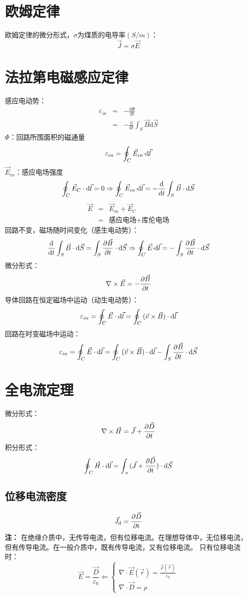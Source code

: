 \section{欧姆定律}
欧姆定律的微分形式，$\sigma$为煤质的电导率$(S/m)$：
$$\vec{J}=\sigma\vec{E}$$

\section{法拉第电磁感应定律}
感应电动势：
\begin{eqnarray*}
	\varepsilon_{in} &=& -\frac{\mathrm{d}\Phi}{\mathrm{d}t} \\
	&=& - \frac{\mathrm{d}}{\mathrm{d}t}\int_S \vec{B}\mathrm{d}\vec{S}
\end{eqnarray*}
$\Phi$：回路所围面积的磁通量
$${\varepsilon _{in}} = \oint_C {{{\vec E}_{in}}\cdot} {\rm{ d}}\vec l$$
$\vec{E}_{in}$：感应电场强度
$$\oint_C\vec{E}_C\cdot\mathrm{d}\vec{l}=0 \Rightarrow \oint_C {{{\vec E}_{in}}\cdot} {\rm{d}}\vec l =  - {{\rm{d}} \over {{\rm{d}}t}}\int_S {\vec B\cdot{\rm{d}}\vec S} $$
\begin{eqnarray*}
	\vec{E}&=&\vec{E}_{in}+\vec{E}_C \\
	&=&\text{感应电场}+\text{库伦电场}
\end{eqnarray*}
回路不变，磁场随时间变化（感生电动势）：
$${{\rm{d}} \over {{\rm{d}}t}}\int_S {\vec B \cdot {\rm{d}}\vec S}  = \int_S {{{\partial \vec B} \over {\partial t}} \cdot {\rm{d}}\vec S} \Rightarrow \oint_C {\vec E \cdot } {\rm{d}}\vec l =  - \int_S {{{\partial \vec B} \over {\partial t}} \cdot {\rm{d}}\vec S}$$
微分形式：
$$\nabla  \times \vec E =  - {{\partial \vec B} \over {\partial t}}$$
导体回路在恒定磁场中运动（动生电动势）：
$${\varepsilon _{in}} = \oint_C {\vec E \cdot {\rm{d}}\vec l}  = \oint_C {(\vec v \times \vec B) \cdot {\rm{d}}\vec l} $$
回路在时变磁场中运动：
$${\varepsilon _{in}} = \oint_C {\vec E \cdot {\rm{d}}\vec l}  = \oint_C {(\vec v \times \vec B) \cdot {\rm{d}}\vec l}  - \int_S {{{\partial \vec B} \over {\partial t}}}  \cdot {\rm{d}}\vec S$$

\section{全电流定理}
微分形式：
$$\nabla  \times \vec H = \vec J + {{\partial \vec D} \over {\partial t}}$$
积分形式：
$$\oint_{\,C} {\vec H \cdot {\rm{d}}\vec l = \int_{\,s} {(\vec J + {{\partial \vec D} \over {\partial t}})} }  \cdot {\rm{d}}\vec S$$

\subsection*{位移电流密度}
$${\vec J_{\rm{d}}} = {{\partial \vec D} \over {\partial {\rm{t}}}}$$
\textbf{注：}
在绝缘介质中，无传导电流，但有位移电流。在理想导体中，无位移电流，但有传导电流。在一般介质中，既有传导电流，又有位移电流。
只有位移电流时：
$$ \vec{E} = \frac{\vec{D}}{\varepsilon_0} \Leftarrow 
\left\{
\begin{gathered}
	\nabla\cdot\vec{E}(\vec{r})=\frac{\vec{\rho}(\vec{r})}{\varepsilon_0} \\
	\nabla\cdot\vec{D}=\rho
\end{gathered}
\right.$$


